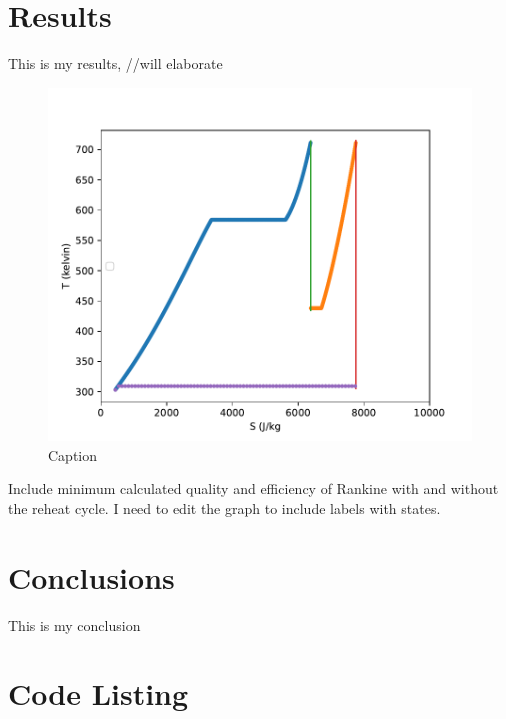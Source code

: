 \documentclass{article}
\begin{document}
\section{Results}

This is my results, //will elaborate
\begin{figure}
    \centering
    \includegraphics{Fig_test.pdf}
    \caption{Caption}
    \label{fig:my_label}
\end{figure}

\FloatBarrier

Include minimum calculated quality and efficiency of Rankine with and without the reheat cycle. I need to edit the graph to include labels with states.

\section{Conclusions}

This is my conclusion

\appendix

\FloatBarrier %





\section*{Code Listing}


\end{document}
